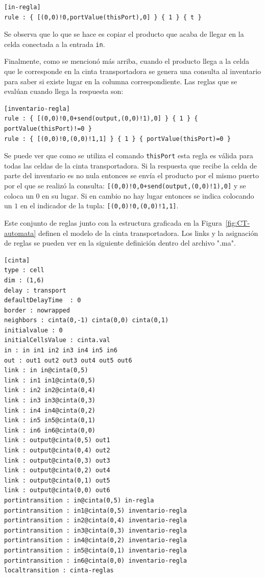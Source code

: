 \documentclass[10pt]{article}
\begin{document}
\begin{minipage}{1\textwidth}
	\centering
	\begin{lstlisting}
[in-regla]
rule : { [(0,0)!0,portValue(thisPort),0] } { 1 } { t }
	\end{lstlisting}
\end{minipage}

Se observa que lo que se hace es copiar el producto que acaba de llegar en la celda conectada a la entrada \texttt{in}.

Finalmente, como se mencionó más arriba, cuando el producto llega a la celda que le corresponde en la cinta transportadora se genera una consulta al inventario para saber si existe lugar en la columna correspondiente. Las reglas que se evalúan cuando llega la respuesta son:

\begin{minipage}{1\textwidth}
	\centering
	\begin{lstlisting}
[inventario-regla]
rule : { [(0,0)!0,0+send(output,(0,0)!1),0] } { 1 } { portValue(thisPort)!=0 }
rule : { [(0,0)!0,(0,0)!1,1] } { 1 } { portValue(thisPort)=0 }
	\end{lstlisting}
\end{minipage}

Se puede ver que como se utiliza el comando \texttt{thisPort} esta regla es válida para todas las celdas de la cinta transportadora. Si la respuesta que recibe la celda de parte del inventario es no nula entonces se envía el producto por el mismo puerto por el que se realizó la consulta: \texttt{[(0,0)!0,0+send(output,(0,0)!1),0]} y se coloca un $0$ en su lugar. Si en cambio no hay lugar entonces se indica colocando un $1$ en el indicador de la tupla: \texttt{[(0,0)!0,(0,0)!1,1]}.

Este conjunto de reglas junto con la estructura graficada en la Figura~\ref{fig:CT-automata} definen el modelo de la cinta transportadora. Los links y la asignación de reglas se pueden ver en la siguiente definición dentro del archivo ".ma".

\begin{minipage}{1\textwidth}
	\centering
	\begin{lstlisting}
[cinta]
type : cell
dim : (1,6)
delay : transport
defaultDelayTime  : 0
border : nowrapped
neighbors : cinta(0,-1) cinta(0,0) cinta(0,1)
initialvalue : 0
initialCellsValue : cinta.val
in : in in1 in2 in3 in4 in5 in6
out : out1 out2 out3 out4 out5 out6
link : in in@cinta(0,5)
link : in1 in1@cinta(0,5)
link : in2 in2@cinta(0,4)
link : in3 in3@cinta(0,3)
link : in4 in4@cinta(0,2)
link : in5 in5@cinta(0,1)
link : in6 in6@cinta(0,0)
link : output@cinta(0,5) out1
link : output@cinta(0,4) out2
link : output@cinta(0,3) out3
link : output@cinta(0,2) out4
link : output@cinta(0,1) out5
link : output@cinta(0,0) out6
portintransition : in@cinta(0,5) in-regla
portintransition : in1@cinta(0,5) inventario-regla
portintransition : in2@cinta(0,4) inventario-regla
portintransition : in3@cinta(0,3) inventario-regla
portintransition : in4@cinta(0,2) inventario-regla
portintransition : in5@cinta(0,1) inventario-regla
portintransition : in6@cinta(0,0) inventario-regla
localtransition : cinta-reglas
	\end{lstlisting}
\end{minipage}
\end{document}
